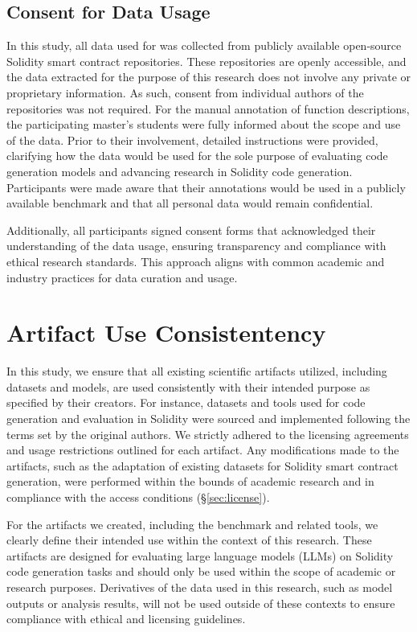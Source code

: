 \subsection{Consent for Data Usage}

In this study, all data used for \datasetname was collected from publicly available open-source Solidity smart contract repositories. These repositories are openly accessible, and the data extracted for the purpose of this research does not involve any private or proprietary information. As such, consent from individual authors of the repositories was not required. For the manual annotation of function descriptions, the participating master's students were fully informed about the scope and use of the data. Prior to their involvement, detailed instructions were provided, clarifying how the data would be used for the sole purpose of evaluating code generation models and advancing research in Solidity code generation. Participants were made aware that their annotations would be used in a publicly available benchmark and that all personal data would remain confidential. 

Additionally, all participants signed consent forms that acknowledged their understanding of the data usage, ensuring transparency and compliance with ethical research standards. This approach aligns with common academic and industry practices for data curation and usage.


\section{Artifact Use Consistentency}

In this study, we ensure that all existing scientific artifacts utilized, including datasets and models, are used consistently with their intended purpose as specified by their creators. For instance, datasets and tools used for code generation and evaluation in Solidity were sourced and implemented following the terms set by the original authors. We strictly adhered to the licensing agreements and usage restrictions outlined for each artifact. Any modifications made to the artifacts, such as the adaptation of existing datasets for Solidity smart contract generation, were performed within the bounds of academic research and in compliance with the access conditions (\S\ref{sec:license}).

For the artifacts we created, including the \datasetname benchmark and related tools, we clearly define their intended use within the context of this research. These artifacts are designed for evaluating large language models (LLMs) on Solidity code generation tasks and should only be used within the scope of academic or research purposes. Derivatives of the data used in this research, such as model outputs or analysis results, will not be used outside of these contexts to ensure compliance with ethical and licensing guidelines.


